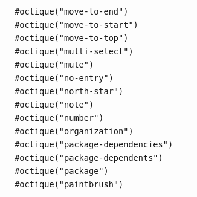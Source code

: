 \begin{longtable}[]{@{}lc@{}}
\texttt{\ \#octique("move-to-end")\ } &
\pandocbounded{} \\
\texttt{\ \#octique("move-to-start")\ } &
\pandocbounded{} \\
\texttt{\ \#octique("move-to-top")\ } &
\pandocbounded{} \\
\texttt{\ \#octique("multi-select")\ } &
\pandocbounded{} \\
\texttt{\ \#octique("mute")\ } &
\pandocbounded{} \\
\texttt{\ \#octique("no-entry")\ } &
\pandocbounded{} \\
\texttt{\ \#octique("north-star")\ } &
\pandocbounded{} \\
\texttt{\ \#octique("note")\ } &
\pandocbounded{} \\
\texttt{\ \#octique("number")\ } &
\pandocbounded{} \\
\texttt{\ \#octique("organization")\ } &
\pandocbounded{} \\
\texttt{\ \#octique("package-dependencies")\ } &
\pandocbounded{} \\
\texttt{\ \#octique("package-dependents")\ } &
\pandocbounded{} \\
\texttt{\ \#octique("package")\ } &
\pandocbounded{} \\
\texttt{\ \#octique("paintbrush")\ } &
\pandocbounded{} \\

\end{longtable}

